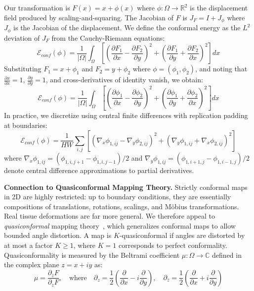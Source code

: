 \documentclass[10pt,journal,compsoc]{IEEEtran}
\begin{document}
Our transformation is $F(x) = x + \phi(x)$ where $\phi: \Omega \rightarrow \mathbb{R}^2$ is the displacement field produced by scaling-and-squaring. The Jacobian of $F$ is $J_F = I + J_\phi$ where $J_\phi$ is the Jacobian of the displacement. We define the conformal energy as the $L^2$ deviation of $J_F$ from the Cauchy-Riemann equations:
\begin{equation}
\mathcal{E}_{conf}(\phi) = \frac{1}{|\Omega|} \int_\Omega \left[ \left( \frac{\partial F_1}{\partial x} - \frac{\partial F_2}{\partial y} \right)^2 + \left( \frac{\partial F_1}{\partial y} + \frac{\partial F_2}{\partial x} \right)^2 \right] dx
\label{eq:conformal_energy}
\end{equation}
Substituting $F_1 = x + \phi_1$ and $F_2 = y + \phi_2$ where $\phi = (\phi_1, \phi_2)$, and noting that $\frac{\partial x}{\partial x} = 1$, $\frac{\partial y}{\partial y} = 1$, and cross-derivatives of identity vanish, we obtain:
\begin{equation}
\mathcal{E}_{conf}(\phi) = \frac{1}{|\Omega|} \int_\Omega \left[ \left( \frac{\partial \phi_1}{\partial x} - \frac{\partial \phi_2}{\partial y} \right)^2 + \left( \frac{\partial \phi_1}{\partial y} + \frac{\partial \phi_2}{\partial x} \right)^2 \right] dx
\end{equation}
In practice, we discretize using central finite differences with replication padding at boundaries:
\begin{equation}
\mathcal{E}_{conf}(\phi) = \frac{1}{HW} \sum_{i,j} \left[ \left( \nabla_x \phi_{1,ij} - \nabla_y \phi_{2,ij} \right)^2 + \left( \nabla_y \phi_{1,ij} + \nabla_x \phi_{2,ij} \right)^2 \right]
\end{equation}
where $\nabla_x \phi_{1,ij} = (\phi_{1,i,j+1} - \phi_{1,i,j-1})/2$ and $\nabla_y \phi_{1,ij} = (\phi_{1,i+1,j} - \phi_{1,i-1,j})/2$ denote central difference approximations to partial derivatives.

\textbf{Connection to Quasiconformal Mapping Theory.} Strictly conformal maps in 2D are highly restricted: up to boundary conditions, they are essentially compositions of translations, rotations, scalings, and Möbius transformations. Real tissue deformations are far more general. We therefore appeal to \textit{quasiconformal} mapping theory~\cite{ahlfors2006conformal}, which generalizes conformal maps to allow bounded angle distortion. A map is $K$-quasiconformal if angles are distorted by at most a factor $K \geq 1$, where $K=1$ corresponds to perfect conformality. Quasiconformality is measured by the Beltrami coefficient $\mu: \Omega \rightarrow \mathbb{C}$ defined in the complex plane $z = x + iy$ as:
\begin{equation}
\mu = \frac{\partial_{\bar{z}} F}{\partial_z F}, \quad \text{where} \quad \partial_z = \frac{1}{2}\left( \frac{\partial}{\partial x} - i \frac{\partial}{\partial y} \right), \quad \partial_{\bar{z}} = \frac{1}{2}\left( \frac{\partial}{\partial x} + i \frac{\partial}{\partial y} \right)
\end{equation}
\end{document}
